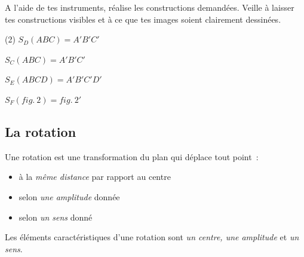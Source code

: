 \documentclass[../math2.tex]{subfiles}
\begin{document}
\begin{exercise}
    A l'aide de tes instruments, réalise les constructions demandées.
    Veille à laisser tes constructions visibles et à ce que tes images
    soient clairement dessinées.
    \begin{tasks}[after-item-skip=2cm](2)
        \task \(S_{D}(ABC)=A'B'C'\)
        \begin{center}
            \tikzspace
            
            \tikzspace
        \end{center}
        \task \(S_{C}(ABC)=A'B'C'\)
        \begin{center}
            \tikzspace
            
            \tikzspace
        \end{center}
        \task \(S_{E}(ABCD)=A'B'C'D'\)
        \begin{center}
            \tikzspace
            
            \tikzspace
        \end{center}
        \task \(S_{F}(fig.~2)=fig.~2'\)
        \begin{center}
            \tikzspace
            
            \tikzspace
        \end{center}
    \end{tasks}
\end{exercise}

\subsection{La rotation}
Une rotation est une transformation du plan qui déplace tout point~:

\begin{itemize}[label=]
    \item à la \emph{même distance} par rapport au centre
    \item selon \emph{une amplitude} donnée
    \item selon \emph{un sens} donné
\end{itemize}

Les éléments caractéristiques d'une rotation sont
\emph{un centre, une amplitude} et \emph{un sens}.
\end{document}

